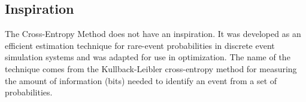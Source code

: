 \subsection{Inspiration}
The Cross-Entropy Method does not have an inspiration. It was developed as an efficient estimation technique for rare-event probabilities in discrete event simulation systems and was adapted for use in optimization.
The name of the technique comes from the Kullback-Leibler cross-entropy method for measuring the amount of information (bits) needed to identify an event from a set of probabilities.


